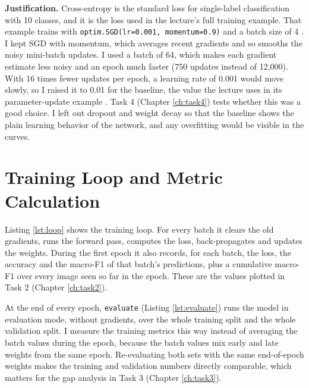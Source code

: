 \textbf{Justification.} Cross-entropy is the standard loss for
single-label classification with 10 classes, and it is the loss used in
the lecture's full training example. That example trains with
\texttt{optim.SGD(lr=0.001, momentum=0.9)} and a batch size of 4
\citep{abidl08}. I kept SGD with momentum, which averages recent
gradients and so smooths the noisy mini-batch updates. I used a batch
of 64, which makes each gradient estimate less noisy and an epoch much
faster (750 updates instead of 12,000). With 16 times fewer updates per
epoch, a learning rate of 0.001 would move slowly, so I raised it to
0.01 for the baseline, the value the lecture uses in its
parameter-update example \citep{abidl08}. Task 4 (Chapter
\ref{ch:task4}) tests whether this was a good choice. I left out dropout and weight decay so that the baseline shows
the plain learning behavior of the network, and any overfitting would be
visible in the curves.


\section{Training Loop and Metric Calculation}
\label{sec:loop}

Listing \ref{lst:loop} shows the training loop. For every batch it
clears the old gradients, runs the forward pass, computes the loss,
back-propagates and updates the weights. During the first epoch it also
records, for each batch, the loss, the accuracy and the macro-F1 of that
batch's predictions, plus a cumulative macro-F1 over every image seen so
far in the epoch. These are the values plotted in Task 2 (Chapter
\ref{ch:task2}).



At the end of every epoch, \texttt{evaluate} (Listing \ref{lst:evaluate})
runs the model in evaluation mode, without gradients, over the whole
training split and the whole validation split. I measure the training
metrics this way instead of averaging the batch values during the epoch,
because the batch values mix early and late weights from the same epoch.
Re-evaluating both sets with the same end-of-epoch weights makes the
training and validation numbers directly comparable, which matters for
the gap analysis in Task 3 (Chapter \ref{ch:task3}).


